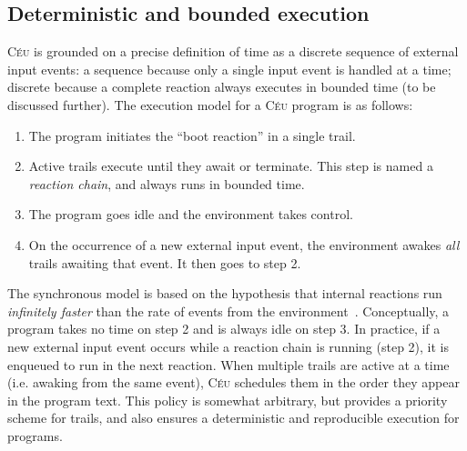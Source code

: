 \documentclass[10pt]{sensys-proc}
\newcommand{\CEU}{\textsc{C\'{e}u}\xspace}
\begin{document}
\subsection{Deterministic and bounded execution}
\label{sec.ceu.det}


\CEU{} is grounded on a precise definition of time as a discrete sequence of 
external input events:
a sequence because only a single input event is handled at a time; discrete 
because a complete reaction always executes in bounded time (to be discussed 
further).
The execution model for a \CEU{} program is as follows:

\begin{enumerate}
\item The program initiates the ``boot reaction'' in a single trail.
\item Active trails execute until they await or terminate.
      This step is named a \emph{reaction chain}, and always runs in bounded 
      time.
\item The program goes idle and the environment takes control.
\item On the occurrence of a new external input event, the environment awakes 
      \emph{all} trails awaiting that event.
      It then goes to step 2.
\end{enumerate}

The synchronous model is based on the hypothesis that internal reactions run 
\emph{infinitely faster} than the rate of events from the 
environment~\cite{rp.hypothesis}.
Conceptually, a program takes no time on step 2 and is always idle on step 3.
In practice, if a new external input event occurs while a reaction chain is 
running (step 2), it is enqueued to run in the next reaction.
%
%
When multiple trails are active at a time (i.e. awaking from the same event), 
\CEU schedules them in the order they appear in the program text.
This policy is somewhat arbitrary, but provides a priority scheme for trails, 
and also ensures a deterministic and reproducible execution for programs.
\end{document}
